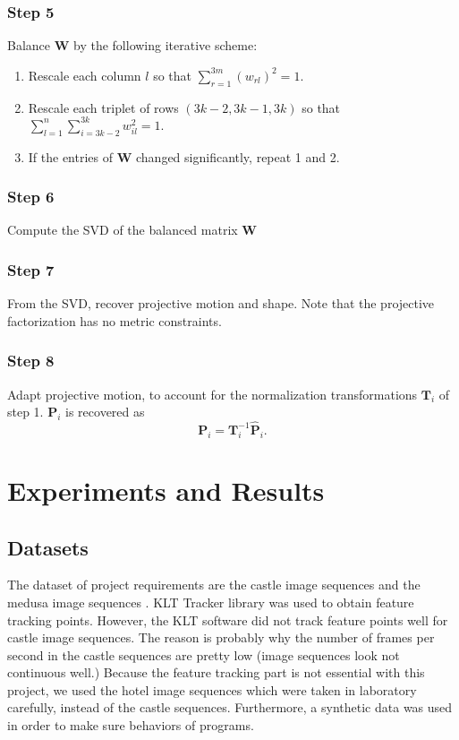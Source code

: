 \subsection{Step 5}

Balance $ \textbf{W} $ by the following iterative scheme:
\begin{enumerate}
\item Rescale each column $ l $ so that $ \sum_{r=1}^{3m} (w_{rl})^2 = 1. $
\item Rescale each triplet of rows $ (3k -2, 3k-1, 3k)  $ so that $ \sum^{n}_{l=1} \sum_{i=3k-2}^{3k} w_{il}^2 = 1. $
\item If the entries of \textbf{W} changed significantly, repeat 1 and 2. 
\end{enumerate}

\subsection{Step 6}

Compute the SVD of the balanced matrix \textbf{W}

\subsection{Step 7}
From the SVD, recover projective motion and shape. Note that the projective factorization has no metric constraints. 

\subsection{Step 8}

Adapt projective motion, to account for the normalization transformations $ \textbf{T}_i $ of step 1.
$ \textbf{P}_i $ is recovered as
$$ \textbf{P}_i  = \textbf{T}_i^{-1} \hat{\textbf{P}}_i. $$

\chapter{Experiments and Results}

\section{Datasets}

The dataset of project requirements are the castle image sequences \cite{Castle} and the medusa image sequences \cite{Medusa}. KLT Tracker library \cite{KLT} was used to obtain feature tracking points. 
However, the KLT software did not track feature points well for castle image sequences. The reason is probably why the number of frames per second in the castle sequences are pretty low (image sequences look not continuous well.) Because the feature tracking part is not essential with this project, we used the hotel image sequences \cite{Hotel} which were taken in laboratory carefully, instead of the castle sequences. Furthermore, a synthetic data was used in order to make sure behaviors of programs. 

